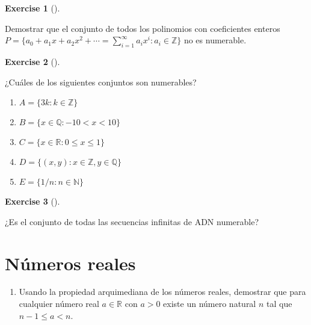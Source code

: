 \documentclass[
  letterpaper,
  DIV=11,
  numbers=noendperiod]{scrreport}
\providecommand{\tightlist}{%
  \setlength{\itemsep}{0pt}\setlength{\parskip}{0pt}}\usepackage{longtable,booktabs,array}
\theoremstyle{definition}
\newtheorem{exercise}{Exercise}[chapter]
\theoremstyle{remark}
\begin{document}
\leavevmode{}%
\begin{exercise}[]\label{exr-21}

Demostrar que el conjunto de todos los polinomios con coeficientes
enteros
\(P=\{a_0+a_1x+a_2x^2+\cdots = \sum_{i=1}^\infty a_ix^i : a_i\in \mathbb{Z}\}\)
no es numerable.

\end{exercise}

\leavevmode{}%
\begin{exercise}[]\label{exr-22}

¿Cuáles de los siguientes conjuntos son numerables?

\begin{enumerate}
\def\labelenumi{\alph{enumi}.}
\tightlist
\item
  \(A=\{3k: k\in \mathbb{Z}\}\)
\item
  \(B=\{x\in \mathbb{Q}: -10 < x < 10\}\)
\item
  \(C = \{x\in \mathbb{R}: 0\leq x\leq 1\}\)
\item
  \(D=\{(x,y): x\in \mathbb{Z}, y\in \mathbb{Q}\}\)
\item
  \(E=\{1/n : n\in \mathbb{N}\}\)
\end{enumerate}

\end{exercise}

\leavevmode{}%
\begin{exercise}[]\label{exr-23}

¿Es el conjunto de todas las secuencias infinitas de ADN numerable?

\end{exercise}


\hypertarget{nuxfameros-reales}{%
\chapter{Números reales}\label{nuxfameros-reales}}

\begin{enumerate}
\def\labelenumi{\arabic{enumi}.}
\tightlist
\item
  Usando la propiedad arquimediana de los números reales, demostrar que
  para cualquier número real \(a\in\mathbb{R}\) con \(a>0\) existe un
  número natural \(n\) tal que \(n-1\leq a< n\).
\end{enumerate}
\end{document}
